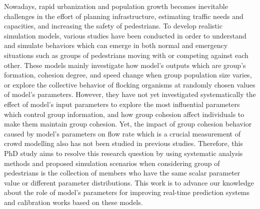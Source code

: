 \documentclass[a4paper,11pt,phdthesis,singlespace,twoside]{cssethesis}
\begin{document}
\frontmatter					%

\thesistitlepage				%
\tableofcontents				%
\listoftables					%
\listoffigures					%

\begin{thesisabstract}			%
Nowadays, rapid urbanization and population growth becomes inevitable challenges in the effort of planning infrastructure, estimating traffic needs and capacities, and increasing the safety of pedestrians. To develop realistic simulation models, various studies have been conducted in order to understand and simulate behaviors which can emerge in both normal and emergency situations such as groups of pedestrians moving with or competing against each other. These models mainly investigate how model's outputs which are group's formation, cohesion degree, and speed change when group population size varies, or explore the collective behavior of flocking organisms at randomly chosen values of model's parameters. However, they have not yet investigated systematically the effect of model's input parameters to explore the most influential parameters which control group information, and how group cohesion affect individuals to make them maintain group cohesion. Yet, the impact of group cohesion behavior caused by model's parameters on flow rate which is a crucial measurement of crowd modelling also has not been studied in previous studies. Therefore, this PhD study aims to resolve this research question by using systematic analysis methods and proposed simulation scenarios when considering group of pedestrians is the collection of members who have the same scalar parameter value or different parameter distributions. This work is to advance our knowledge about the role of model's parameters for improving real-time prediction systems and calibration works based on these models.

\end{thesisabstract}                 
\let\cleardoublepage\clearpage

\end{document}
